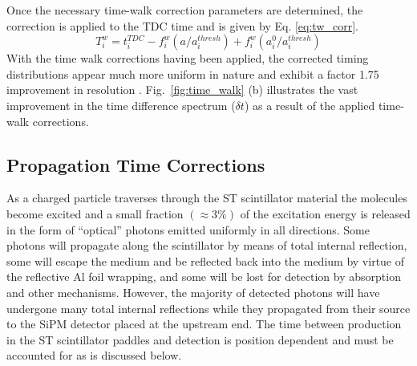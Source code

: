 Once the necessary time-walk correction parameters are determined, the correction is applied to the TDC time and is given by Eq. \ref{eq:tw_corr}.
	\begin{equation} \label{eq:tw_corr}
		T^{w}_{i} = t^{TDC}_{i} - f^{w}_{i}(a/a^{thresh}_{i}) + f^{w}_{i}(a^{0}_{i}/a^{thresh}_{i})
	\end{equation}
With the time walk corrections having been applied, the corrected timing distributions appear much more uniform in nature and exhibit a factor 1.75 improvement in resolution \cite{pooser16}.  Fig.~\ref{fig:time_walk} (b) illustrates the vast improvement in the time difference spectrum ($\delta t$) as a result of the applied time-walk corrections.

\subsection{Propagation Time Corrections} \label{sec:calib_ptc}

As a charged particle traverses through the ST scintillator material the molecules become excited and a small fraction $(\approx 3\%)$ \cite{pdg_2012} of the excitation energy is released in the form of ``optical'' photons emitted uniformly in all directions.  Some photons will propagate along the scintillator by means of total internal reflection, some will escape the medium and be reflected back into the medium by virtue of the reflective Al foil wrapping, and some will be lost for detection by absorption and other mechanisms.  However, the majority of detected  photons will have undergone many total internal reflections while they propagated from their source to the SiPM detector placed at the upstream end.  The time between production in the ST scintillator paddles and detection is position dependent and must be accounted for as is discussed below.

